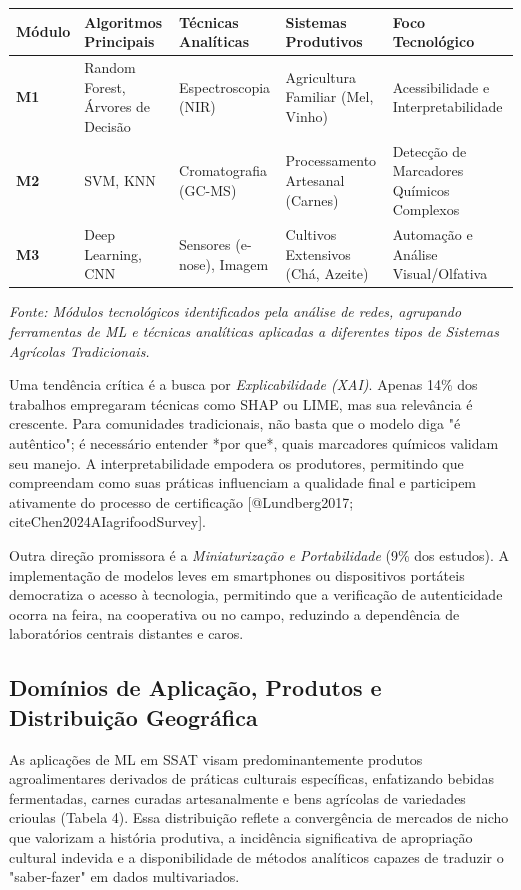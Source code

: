 \begin{table}[h]
\centering
\small
\begin{tabular}{|l|l|l|l|l|}
\hline
\textbf{Módulo} & \textbf{Algoritmos Principais} & \textbf{Técnicas Analíticas} & \textbf{Sistemas Produtivos} & \textbf{Foco Tecnológico} \\ \hline
\textbf{M1} & Random Forest, Árvores de Decisão & Espectroscopia (NIR) & Agricultura Familiar (Mel, Vinho) & Acessibilidade e Interpretabilidade \\ \hline
\textbf{M2} & SVM, KNN & Cromatografia (GC-MS) & Processamento Artesanal (Carnes) & Detecção de Marcadores Químicos Complexos \\ \hline
\textbf{M3} & Deep Learning, CNN & Sensores (e-nose), Imagem & Cultivos Extensivos (Chá, Azeite) & Automação e Análise Visual/Olfativa \\ \hline
\end{tabular}
\end{table}

\emph{Fonte: Módulos tecnológicos identificados pela análise de redes, agrupando ferramentas de ML e técnicas analíticas aplicadas a diferentes tipos de Sistemas Agrícolas Tradicionais.}

Uma tendência crítica é a busca por \textit{Explicabilidade (XAI)}. Apenas 14\% dos trabalhos empregaram técnicas como SHAP ou LIME, mas sua relevância é crescente. Para comunidades tradicionais, não basta que o modelo diga "é autêntico"; é necessário entender *por que*, quais marcadores químicos validam seu manejo. A interpretabilidade empodera os produtores, permitindo que compreendam como suas práticas influenciam a qualidade final e participem ativamente do processo de certificação [@Lundberg2017;  \\cite{Chen2024AIagrifoodSurvey}].

Outra direção promissora é a \textit{Miniaturização e Portabilidade} (9\% dos estudos). A implementação de modelos leves em smartphones ou dispositivos portáteis democratiza o acesso à tecnologia, permitindo que a verificação de autenticidade ocorra na feira, na cooperativa ou no campo, reduzindo a dependência de laboratórios centrais distantes e caros.

\subsection{Domínios de Aplicação, Produtos e Distribuição Geográfica}

As aplicações de ML em SSAT visam predominantemente produtos agroalimentares derivados de práticas culturais específicas, enfatizando bebidas fermentadas, carnes curadas artesanalmente e bens agrícolas de variedades crioulas (Tabela 4). Essa distribuição reflete a convergência de mercados de nicho que valorizam a história produtiva, a incidência significativa de apropriação cultural indevida e a disponibilidade de métodos analíticos capazes de traduzir o "saber-fazer" em dados multivariados.

